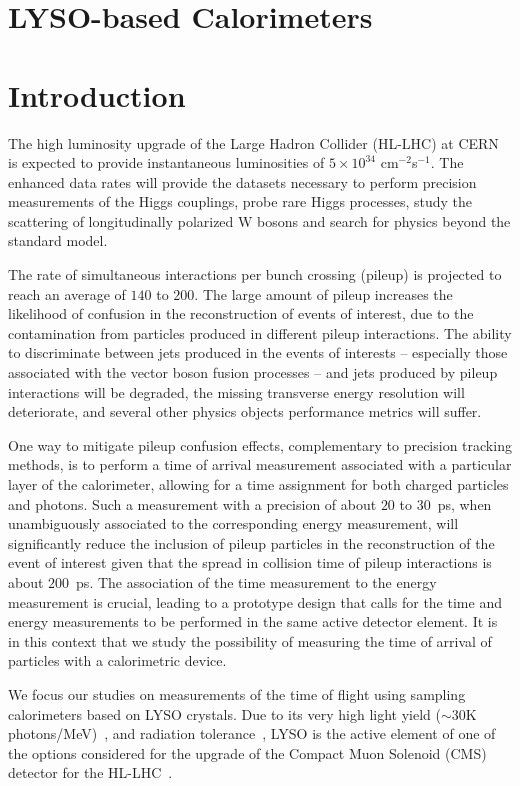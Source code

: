 \section{LYSO-based Calorimeters}
\section{Introduction}

The high luminosity upgrade of the Large Hadron Collider (HL-LHC) at
CERN~\cite{Rossi:1471000} is expected to provide instantaneous luminosities of
$5\times10^{34}$ cm$^{-2}$s$^{-1}$. The enhanced data rates will
provide the datasets necessary to perform precision measurements of the Higgs couplings, 
probe rare Higgs processes, study the scattering of longitudinally polarized W
bosons and search for physics beyond the standard model. 

The  rate of simultaneous interactions per bunch crossing (pileup) is  projected to reach 
an average of $140$ to $200$. The large amount of pileup increases the likelihood of 
confusion in the reconstruction of events of interest, due to the contamination from 
particles produced in different pileup interactions. The ability to discriminate between 
jets produced in the events of interests -- especially those associated with the vector 
boson fusion processes -- and jets produced by pileup interactions will be degraded, 
the missing transverse energy resolution will deteriorate, and several other physics 
objects performance metrics will suffer.

One way to mitigate pileup confusion effects, complementary to precision tracking methods, 
is to perform a time of arrival measurement associated with a particular layer of the calorimeter, 
allowing for a time assignment for both charged particles and photons. Such a measurement with 
a precision of about $20$ to $30$~ps, when unambiguously associated to the corresponding energy
measurement, will significantly reduce the inclusion of pileup particles in  the
reconstruction of the event of interest given that the spread in collision time of
pileup interactions is about $200$~ps. The association of the time measurement to the energy 
measurement is crucial,  leading to  a  prototype  design that calls for the time and energy 
measurements to be performed in the same active detector element. It is in this context that we 
study the possibility of measuring the time of arrival of particles with a calorimetric device.

We focus our studies on measurements of the time of flight using sampling calorimeters 
based on LYSO crystals. Due to its very high light yield 
($\sim 30$K photons/MeV)~\cite{LYSOProperties}, and radiation 
tolerance~\cite{5402126, 4291695, 5402125, Dissertori:2013rma}, LYSO
is the active element of one of the options considered for the upgrade of the
Compact Muon Solenoid (CMS) detector for the HL-LHC~\cite{Contardo:1605208}. 

